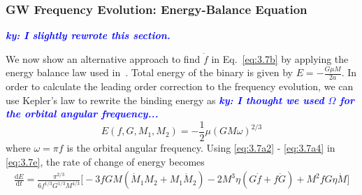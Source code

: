\documentclass[11pt]{article}
\newcommand{\ky}[1]{\textcolor{blue}{\it{\textbf{ky: #1}}} }
\begin{document}
 \subsubsection*{GW Frequency Evolution: Energy-Balance Equation}
 
 \ky{I slightly rewrote this section.}
 
 \hspace{15.5pt} We now show an alternative approach to find $\dot f$ in Eq.~\eqref{eq:3.7b} by applying the energy balance law used in~\cite{Yunes:2009bv}.
 Total energy of the binary is given by $E=-\frac{G\mu M}{2a}$. In order to calculate the leading order correction to the frequency evolution, we can use Kepler's law to rewrite the binding energy as \ky{I thought we used $\Omega$ for the orbital angular frequency...}
 \begin{equation}\label{eq:3.7e}
 E(f,G,M_1,M_2)=-\frac{1}{2}\mu (GM\omega)^{2/3}
 \end{equation}
 where $\omega=\pi f$ is the orbital angular frequency. Using \eqref{eq:3.7a2} - \eqref{eq:3.7a4} in  \eqref{eq:3.7e}, the rate of change of energy becomes
 \begin{align}\label{eq:3.7j}
 \frac{\mathrm{d} E}{\mathrm{d} t}=\frac{\pi^{2/3}}{6f^{1/3}G^{1/3}M^{4/3}}\bigg[-3fGM(\dot{M}_1M_2+M_1\dot{M}_2)-2M^3\eta(G\dot{f}+f\dot{G})+M^2fG\eta\dot{M}\bigg]
 \end{align}
 
\end{document}
